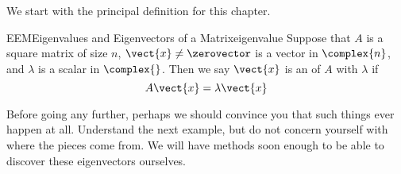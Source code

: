 %
We start with the principal definition for this chapter.
%
%
%
\begin{definition}{EEM}{Eigenvalues and Eigenvectors of a Matrix}{eigenvalue}
Suppose that $A$ is a square matrix of size $n$, $\vect{x}\neq\zerovector$ is a vector in $\complex{n}$, and $\lambda$ is a scalar in $\complex{\null}$.   Then we say $\vect{x}$ is an  of $A$ with  $\lambda$ if
%
\begin{equation*}
A\vect{x}=\lambda\vect{x}
\end{equation*}
%
\end{definition}
%
Before going any further, perhaps we should convince you that such things ever happen at all.  Understand the next example, but do not concern yourself with where the pieces come from.  We will have methods soon enough to be able to discover these eigenvectors ourselves.
